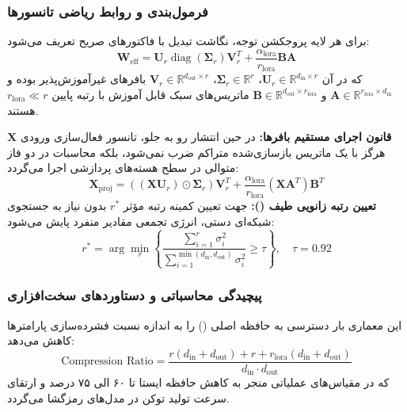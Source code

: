 \documentclass[12pt,a4paper]{report}
\begin{document}
\subsubsection*{فرمول‌بندی و روابط ریاضی تانسورها}
برای هر لایه پروجکشن توجه، نگاشت تبدیل با فاکتورهای صریح تعریف می‌شود:
\[
\mathbf{W}_{\text{eff}} = \mathbf{U}_r \operatorname{diag}(\mathbf{\Sigma}_r) \mathbf{V}_r^T + \frac{\alpha_{\text{lora}}}{r_{\text{lora}}} \mathbf{B} \mathbf{A}
\]
که در آن $\mathbf{U}_r \in \mathbb{R}^{d_{\text{in}} \times r}$، $\mathbf{\Sigma}_r \in \mathbb{R}^r$، $\mathbf{V}_r \in \mathbb{R}^{d_{\text{out}} \times r}$ بافرهای غیرآموزش‌پذیر بوده و $\mathbf{A} \in \mathbb{R}^{r_{\text{lora}} \times d_{\text{in}}}$ و $\mathbf{B} \in \mathbb{R}^{d_{\text{out}} \times r_{\text{lora}}}$ ماتریس‌های سبک قابل آموزش با رتبه پایین $r_{\text{lora}} \ll r$ هستند.

\textbf{قانون اجرای مستقیم بافرها:} در حین انتشار رو به جلو، تانسور فعال‌سازی ورودی $\mathbf{X}$ هرگز با یک ماتریس بازسازی‌شده متراکم ضرب نمی‌شود، بلکه محاسبات در دو فاز متوالی در سطح هسته‌های پردازشی اجرا می‌گردد:
\[
\mathbf{X}_{\text{proj}} = \left( (\mathbf{X} \mathbf{U}_r) \odot \mathbf{\Sigma}_r \right) \mathbf{V}_r^T + \frac{\alpha_{\text{lora}}}{r_{\text{lora}}} (\mathbf{X} \mathbf{A}^T) \mathbf{B}^T
\]
\textbf{تعیین رتبه زانویی طیف ():} جهت تعیین کمینه رتبه مؤثر $r^*$ بدون نیاز به جستجوی شبکه‌ای دستی، انرژی تجمعی مقادیر منفرد پایش می‌شود:
\[
r^* = \arg\min_r \left\{ \frac{\sum_{i=1}^r \sigma_i^2}{\sum_{i=1}^{\min(d_{\text{in}}, d_{\text{out}})} \sigma_i^2} \ge \tau \right\}, \quad \tau = 0.92
\]

\subsubsection*{پیچیدگی محاسباتی و دستاوردهای سخت‌افزاری}
این معماری بار دسترسی به حافظه اصلی () را به اندازه نسبت فشرده‌سازی پارامترها کاهش می‌دهد:
\[
\text{Compression Ratio} = \frac{r(d_{\text{in}} + d_{\text{out}}) + r + r_{\text{lora}}(d_{\text{in}} + d_{\text{out}})}{d_{\text{in}} \cdot d_{\text{out}}}
\]
که در مقیاس‌های عملیاتی منجر به کاهش حافظه ایستا تا ۶۰ الی ۷۵ درصد و ارتقای سرعت تولید توکن در مدل‌های رمزگشا می‌گردد.
\end{document}
